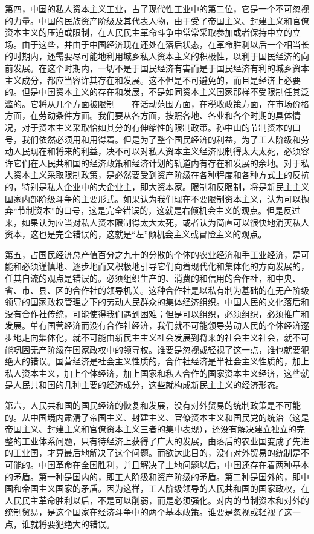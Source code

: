 第四，中国的私人资本主义工业，占了现代性工业中的第二位，它是一个不可忽视的力量。中国的民族资产阶级及其代表人物，由于受了帝国主义、封建主义和官僚资本主义的压迫或限制，在人民民主革命斗争中常常采取参加或者保持中立的立场。由于这些，并由于中国经济现在还处在落后状态，在革命胜利以后一个相当长的时期内，还需要尽可能地利用城乡私人资本主义的积极性，以利于国民经济的向前发展。在这个时期内，一切不是于国民经济有害而是于国民经济有利的城乡资本主义成分，都应当容许其存在和发展。这不但是不可避免的，而且是经济上必要的。但是中国资本主义的存在和发展，不是如同资本主义国家那样不受限制任其泛滥的。它将从几个方面被限制——在活动范围方面，在税收政策方面，在市场价格方面，在劳动条件方面。我们要从各方面，按照各地、各业和各个时期的具体情况，对于资本主义采取恰如其分的有伸缩性的限制政策。孙中山的节制资本的口号，我们依然必须用和用得着。但是为了整个国民经济的利益，为了工人阶级和劳动人民现在和将来的利益，决不可以对私人资本主义经济限制得太大太死，必须容许它们在人民共和国的经济政策和经济计划的轨道内有存在和发展的余地。对于私人资本主义采取限制政策，是必然要受到资产阶级在各种程度和各种方式上的反抗的，特别是私人企业中的大企业主，即大资本家。限制和反限制，将是新民主主义国家内部阶级斗争的主要形式。如果认为我们现在不要限制资本主义，认为可以抛弃“节制资本”的口号，这是完全错误的，这就是右倾机会主义的观点。但是反过来，如果认为应当对私人资本限制得太大太死，或者认为简直可以很快地消灭私人资本，这也是完全错误的，这就是“左”倾机会主义或冒险主义的观点。

第五，占国民经济总产值百分之九十的分散的个体的农业经济和手工业经济，是可能和必须谨慎地、逐步地而又积极地引导它们向着现代化和集体化的方向发展的，任其自流的观点是错误的。必须组织生产的、消费的和信用的合作社，和中央、省、市、县、区的合作社的领导机关。这种合作社是以私有制为基础的在无产阶级领导的国家政权管理之下的劳动人民群众的集体经济组织。中国人民的文化落后和没有合作社传统，可能使得我们遇到困难；但是可以组织，必须组织，必须推广和发展。单有国营经济而没有合作社经济，我们就不可能领导劳动人民的个体经济逐步地走向集体化，就不可能由新民主主义社会发展到将来的社会主义社会，就不可能巩固无产阶级在国家政权中的领导权。谁要是忽视或轻视了这一点，谁也就要犯绝大的错误。国营经济是社会主义性质的，合作社经济是半社会主义性质的，加上私人资本主义，加上个体经济，加上国家和私人合作的国家资本主义经济，这些就是人民共和国的几种主要的经济成分，这些就构成新民主主义的经济形态。

第六，人民共和国的国民经济的恢复和发展，没有对外贸易的统制政策是不可能的。从中国境内肃清了帝国主义、封建主义、官僚资本主义和国民党的统治（这是帝国主义、封建主义和官僚资本主义三者的集中表现），还没有解决建立独立的完整的工业体系问题，只有待经济上获得了广大的发展，由落后的农业国变成了先进的工业国，才算最后地解决了这个问题。而欲达此目的，没有对外贸易的统制是不可能的。中国革命在全国胜利，并且解决了土地问题以后，中国还存在着两种基本的矛盾。第一种是国内的，即工人阶级和资产阶级的矛盾。第二种是国外的，即中国和帝国主义国家的矛盾。因为这样，工人阶级领导的人民共和国的国家政权，在人民民主革命胜利以后，不是可以削弱，而是必须强化。对内的节制资本和对外的统制贸易，是这个国家在经济斗争中的两个基本政策。谁要是忽视或轻视了这一点，谁就将要犯绝大的错误。

